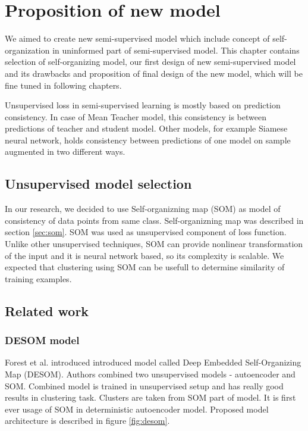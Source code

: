 \chapter{Proposition of new model}

\label{chap:research}

We aimed to create new semi-supervised model which include concept of self-organization in uninformed part of semi-supervised model. This chapter contains selection of self-organizing model, our first design of new semi-supervised model and its drawbacks and proposition of final design of the new model, which will be fine tuned in following chapters.

Unsupervised loss in semi-supervised learning is mostly based on prediction consistency. In case of Mean Teacher model, this consistency is between predictions of teacher and student model. Other models, for example Siamese neural network, holds consistency between predictions of one model on sample augmented in two different ways.

\section{Unsupervised model selection}
In our research, we decided to use Self-organizning map (SOM) as model of consistency of data points from same class. Self-organizning map was described in section \ref{sec:som}. SOM was used as unsupervised component of loss function. Unlike other unsupervised techniques, SOM can provide nonlinear transformation of the input and it is neural network based, so its complexity is scalable. We expected that clustering using SOM can be usefull to determine similarity of training examples.



\section{Related work}

\subsection{DESOM model}

Forest et al. \cite{desom2019} introduced introduced model called  Deep Embedded Self-Organizing Map (DESOM). Authors combined two unsupervised models - autoencoder and SOM. Combined model is trained in unsupervised setup and has really good results in clustering task. Clusters are taken from SOM part of model. It is first ever usage of SOM in deterministic autoencoder model. Proposed model architecture is described in figure \ref{fig:desom}. 


